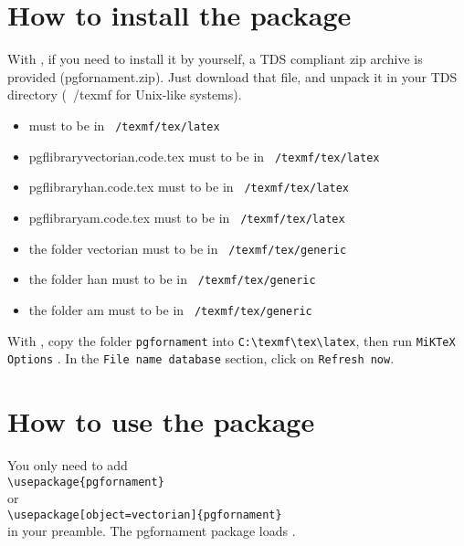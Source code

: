 \documentclass[a4paper,nofonts]{tufte-handout}
\begin{document}
\tableofcontents

\vspace{1cm}
\hfil  {}\hfil

\listoffigures

\vspace{1cm}
\hfil  {}\hfil

\section{How to install the package}
\label{sec:how_to_install}
With , if you need to install it by yourself, a TDS compliant zip archive is
provided (pgfornament.zip).  Just download that file, and unpack it in
your TDS directory (~/texmf for Unix-like systems).
\begin{itemize}
  \item {}  must to be in \texttt{~/texmf/tex/latex}
  \item pgflibraryvectorian.code.tex must to be in \texttt{~/texmf/tex/latex}
  \item pgflibraryhan.code.tex must to be in \texttt{~/texmf/tex/latex}
  \item pgflibraryam.code.tex must to be in \texttt{~/texmf/tex/latex}
  \item the folder vectorian must to be in \texttt{~/texmf/tex/generic}
  \item the folder han must to be in \texttt{~/texmf/tex/generic}
  \item the folder am must to be in \texttt{~/texmf/tex/generic}
\end{itemize}

With , copy the folder {\color{black}\texttt{pgfornament}} into \verb+C:\texmf\tex\latex+, then
run {\color{red}\texttt{MiKTeX Options}}  . In the {\color{black}\texttt{File name database}}  section, click on  {\color{red}\texttt{Refresh now}}.

\section{How to use the package}
\label{sec:how_to_use}
You only need to add \\
{\color{black}\verb+\usepackage{pgfornament}+} \\ or  \\{\color{black}\verb+\usepackage[object=vectorian]{pgfornament}+}\\
 in your preamble. The  pgfornament package loads \TIKZ.
\end{document}
